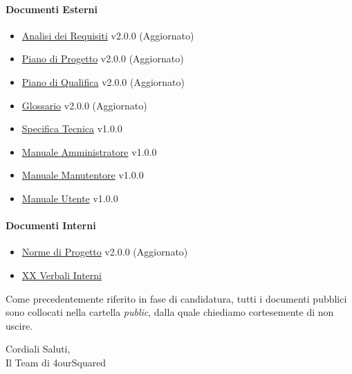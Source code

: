 \documentclass[12pt, a4paper]{article}
\begin{document}
\paragraph{Documenti Esterni}
\begin{itemize}
    \item \href{https://github.com/4ourSquared/LumosMinima/tree/main/public/esterni/analisi_dei_requisiti_v2.0.0.pdf}{Analisi dei Requisiti} v2.0.0 (Aggiornato)
    \item \href{https://github.com/4ourSquared/LumosMinima/tree/main/public/esterni/piano_di_progetto_v2.0.0.pdf}{Piano di Progetto} v2.0.0 (Aggiornato)
    \item \href{https://github.com/4ourSquared/LumosMinima/tree/main/public/esterni/piano_di_qualifica_v2.0.0.pdf}{Piano di Qualifica} v2.0.0 (Aggiornato)
    \item \href{https://github.com/4ourSquared/LumosMinima/tree/main/public/esterni/glossario_v2.0.0.pdf}{Glossario} v2.0.0 (Aggiornato)
    \item \href{https://github.com/4ourSquared/LumosMinima/tree/main/public/esterni/specifica_tecnica_v1.0.0.pdf}{Specifica Tecnica} v1.0.0
    \item \href{https://github.com/4ourSquared/LumosMinima/tree/main/public/esterni/manuale_amministratore_v1.0.0.pdf}{Manuale Amministratore} v1.0.0
    \item \href{https://github.com/4ourSquared/LumosMinima/tree/main/public/esterni/manuale_manutentore_v1.0.0.pdf}{Manuale Manutentore} v1.0.0
    \item \href{https://github.com/4ourSquared/LumosMinima/tree/main/public/esterni/manuale_utente_v1.0.0.pdf}{Manuale Utente} v1.0.0
\end{itemize}
\paragraph{Documenti Interni}
\begin{itemize}
    \item \href{https://github.com/4ourSquared/LumosMinima/tree/main/public/interni/norme_di_progetto_v2.0.0.pdf}{Norme di Progetto} v2.0.0 (Aggiornato)
    \item \href{https://github.com/4ourSquared/LumosMinima/tree/main/public/interni/verbali}{XX Verbali Interni}
\end{itemize}


Come precedentemente riferito in fase di candidatura, tutti i documenti pubblici sono collocati nella cartella \textit{public}, dalla quale chiediamo cortesemente di non uscire.

\begin{flushright}
    Cordiali Saluti,\\
    Il Team di 4ourSquared
    \end{flushright}
\end{document}
